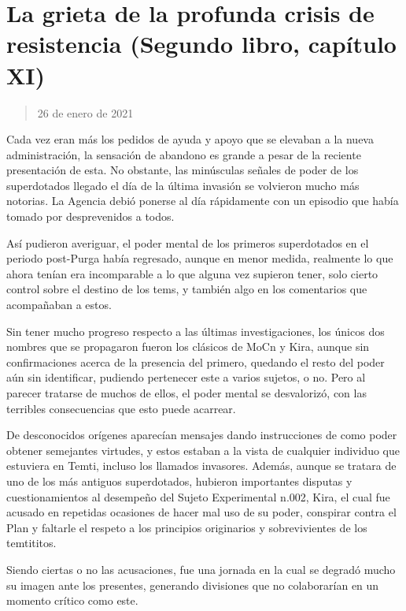 \documentclass[
  spanish,
]{book}
\begin{document}
\hypertarget{la-grieta-de-la-profunda-crisis-de-resistencia-segundo-libro-capuxedtulo-xi}{%
\section{La grieta de la profunda crisis de resistencia (Segundo libro, capítulo XI)}\label{la-grieta-de-la-profunda-crisis-de-resistencia-segundo-libro-capuxedtulo-xi}}

\begin{quote}
26 de enero de 2021
\end{quote}

Cada vez eran más los pedidos de ayuda y apoyo que se elevaban a la nueva administración, la sensación de abandono es grande a pesar de la reciente presentación de esta. No obstante, las minúsculas señales de poder de los superdotados llegado el día de la última invasión se volvieron mucho más notorias. La Agencia debió ponerse al día rápidamente con un episodio que había tomado por desprevenidos a todos.

Así pudieron averiguar, el poder mental de los primeros superdotados en el periodo post-Purga había regresado, aunque en menor medida, realmente lo que ahora tenían era incomparable a lo que alguna vez supieron tener, solo cierto control sobre el destino de los tems, y también algo en los comentarios que acompañaban a estos.

Sin tener mucho progreso respecto a las últimas investigaciones, los únicos dos nombres que se propagaron fueron los clásicos de MoCn y Kira, aunque sin confirmaciones acerca de la presencia del primero, quedando el resto del poder aún sin identificar, pudiendo pertenecer este a varios sujetos, o no. Pero al parecer tratarse de muchos de ellos, el poder mental se desvalorizó, con las terribles consecuencias que esto puede acarrear.

De desconocidos orígenes aparecían mensajes dando instrucciones de como poder obtener semejantes virtudes, y estos estaban a la vista de cualquier individuo que estuviera en Temti, incluso los llamados invasores. Además, aunque se tratara de uno de los más antiguos superdotados, hubieron importantes disputas y cuestionamientos al desempeño del Sujeto Experimental n.002, Kira, el cual fue acusado en repetidas ocasiones de hacer mal uso de su poder, conspirar contra el Plan y faltarle el respeto a los principios originarios y sobrevivientes de los temtititos.

Siendo ciertas o no las acusaciones, fue una jornada en la cual se degradó mucho su imagen ante los presentes, generando divisiones que no colaborarían en un momento crítico como este.
\end{document}
